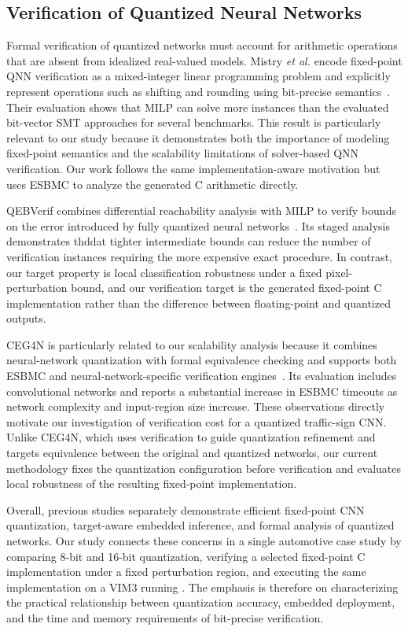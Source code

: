 \subsection{Verification of Quantized Neural Networks}

Formal verification of quantized networks must account for arithmetic operations that are absent from idealized real-valued models. Mistry \emph{et al.} encode fixed-point QNN verification as a mixed-integer linear programming problem and explicitly represent operations such as shifting and rounding using bit-precise semantics~\cite{Mistry2022MILP}. Their evaluation shows that MILP can solve more instances than the evaluated bit-vector SMT approaches for several benchmarks. This result is particularly relevant to our study because it demonstrates both the importance of modeling fixed-point semantics and the scalability limitations of solver-based QNN verification. Our work follows the same implementation-aware motivation but uses ESBMC to analyze the generated C arithmetic directly.

QEBVerif combines differential reachability analysis with MILP to verify bounds on the error introduced by fully quantized neural networks~\cite{Zhang2023QEBVerif}. Its staged analysis demonstrates thddat tighter intermediate bounds can reduce the number of verification instances requiring the more expensive exact procedure. In contrast, our target property is local classification robustness under a fixed pixel-perturbation bound, and our verification target is the generated fixed-point C implementation rather than the difference between floating-point and quantized outputs.

CEG4N is particularly related to our scalability analysis because it combines neural-network quantization with formal equivalence checking and supports both ESBMC and neural-network-specific verification engines~\cite{Matos2022CEG4N}. Its evaluation includes convolutional networks and reports a substantial increase in ESBMC timeouts as network complexity and input-region size increase. These observations directly motivate our investigation of verification cost for a quantized traffic-sign CNN. Unlike CEG4N, which uses verification to guide quantization refinement and targets equivalence between the original and quantized networks, our current methodology fixes the quantization configuration before verification and evaluates local robustness of the resulting fixed-point implementation.

Overall, previous studies separately demonstrate efficient fixed-point CNN quantization, target-aware embedded inference, and formal analysis of quantized networks. Our study connects these concerns in a single automotive case study by comparing 8-bit and 16-bit quantization, verifying a selected fixed-point C implementation under a fixed perturbation region, and executing the same implementation on a VIM3 running \AAOS{}. The emphasis is therefore on characterizing the practical relationship between quantization accuracy, embedded deployment, and the time and memory requirements of bit-precise verification.

